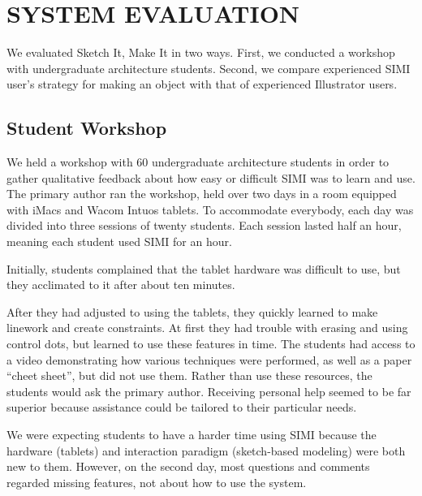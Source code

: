 \documentclass{article}
\begin{document}
\section{SYSTEM EVALUATION}

We evaluated Sketch It, Make It in two ways. First, we conducted a
workshop with undergraduate architecture students. Second, we compare
experienced SIMI user's strategy for making an object with that of
experienced Illustrator users.

\subsection{Student Workshop}

We held a workshop with 60 undergraduate architecture students in
order to gather qualitative feedback about how easy or difficult SIMI
was to learn and use. The primary author ran the workshop, held over
two days in a room equipped with iMacs and Wacom Intuos tablets. To
accommodate everybody, each day was divided into three sessions of
twenty students. Each session lasted half an hour, meaning each
student used SIMI for an hour.


Initially, students complained that the tablet hardware was difficult
to use, but they acclimated to it after about ten minutes. 


After they had adjusted to using the tablets, they quickly learned to
make linework and create constraints. At first they had trouble with
erasing and using control dots, but learned to use these features in
time. The students had access to a video demonstrating how various
techniques were performed, as well as a paper ``cheet sheet'', but did
not use them. Rather than use these resources, the students would ask
the primary author. Receiving personal help seemed to be far superior
because assistance could be tailored to their particular needs.


We were expecting students to have a harder time using SIMI because
the hardware (tablets) and interaction paradigm (sketch-based
modeling) were both new to them. However, on the second day, most
questions and comments regarded missing features, not about how to use
the system. 
\end{document}
